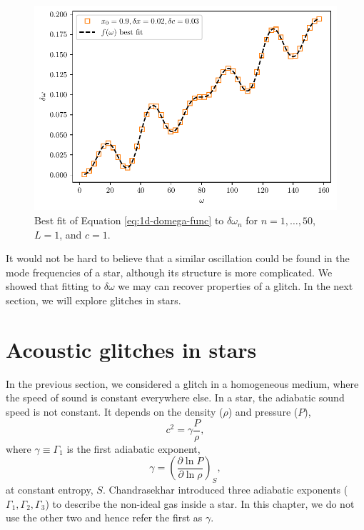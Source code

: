 \begin{figure}
    \centering
    \includegraphics{figures/glitch-1d-fit.pdf}
    \caption{Best fit of Equation \ref{eq:1d-domega-func} to \(\delta\omega_n\) for \(n=1,\dots,50\), \(L=1\), and \(c=1\).}
    \label{fig:1d-fit}
\end{figure}

It would not be hard to believe that a similar oscillation could be found in the mode frequencies of a star, although its structure is more complicated. We showed that fitting to \(\delta\omega\) we may can recover properties of a glitch. In the next section, we will explore glitches in stars.



\section{Acoustic glitches in stars}

In the previous section, we considered a glitch in a homogeneous medium, where the speed of sound is constant everywhere else. In a star, the adiabatic sound speed is not constant. It depends on the density (\(\rho\)) and pressure (\(P\)),
%
\begin{equation}
    c^2 = \gamma \frac{P}{\rho},
\end{equation}
%
where \(\gamma \equiv \Gamma_1\) is the first adiabatic exponent,
%
\begin{equation}
    \gamma = \left( \frac{\partial \ln P}{\partial \ln \rho} \right)_S,
\end{equation}
%
at constant entropy, \(S\). Chandrasekhar \needcite{} introduced three adiabatic exponents (\(\Gamma_1,\Gamma_2,\Gamma_3\)) to describe the non-ideal gas inside a star. In this chapter, we do not use the other two and hence refer the first as \(\gamma\).

